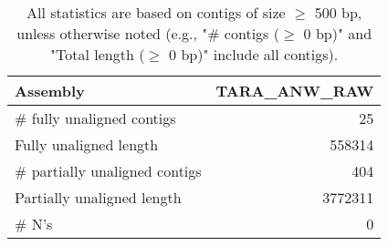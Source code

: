 \documentclass[12pt,a4paper]{article}
\begin{document}
\begin{table}[ht]
\begin{center}
\caption{All statistics are based on contigs of size $\geq$ 500 bp, unless otherwise noted (e.g., "\# contigs ($\geq$ 0 bp)" and "Total length ($\geq$ 0 bp)" include all contigs).}
\begin{tabular}{|l*{1}{|r}|}
\hline
Assembly & TARA\_ANW\_RAW \\ \hline
\# fully unaligned contigs & 25 \\ \hline
Fully unaligned length & 558314 \\ \hline
\# partially unaligned contigs & 404 \\ \hline
Partially unaligned length & 3772311 \\ \hline
\# N's & 0 \\ \hline
\end{tabular}
\end{center}
\end{table}
\end{document}
